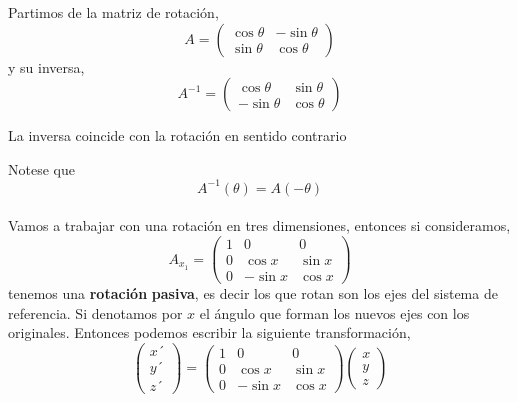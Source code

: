 \documentclass[openany]{book}
\theoremstyle{ucostyle}
\begin{document}
Partimos de la matriz de rotación, 
\begin{equation*}
    A=\begin{pmatrix}
        \cos\theta & - \sin\theta \\\sin\theta & \cos\theta
    \end{pmatrix}
\end{equation*}
y su inversa, 
\begin{equation*}
    A^{-1}=\begin{pmatrix}
        \cos\theta &  \sin\theta \\-\sin\theta & \cos\theta
    \end{pmatrix}
\end{equation*}
\begin{nota}
    La inversa coincide con la rotación en sentido contrario
\end{nota}
Notese que
\begin{equation*}
    A^{-1}(\theta)=A(-\theta)
\end{equation*}
\\
Vamos a trabajar con una rotación en tres dimensiones, entonces si consideramos, 
\begin{equation*}
    A_{x_1}=\begin{pmatrix}
        1&0&0
        \\
        0&\cos x&\sin x
        \\
        0&-\sin x & \cos x
    \end{pmatrix}
\end{equation*}
tenemos una \textbf{rotación} \textbf{pasiva}, es decir los que rotan son los ejes del sistema de referencia.  Si denotamos por $x$ el ángulo que forman los nuevos ejes con los originales. Entonces podemos escribir la siguiente transformación,
\begin{equation*}
    \begin{pmatrix}
        x´
        \\
        y´
        \\
        z´
    \end{pmatrix}=
    \begin{pmatrix}
        1&0&0
        \\
        0&\cos x&\sin x
        \\
        0&-\sin x & \cos x
    \end{pmatrix}
    \begin{pmatrix}
        x
        \\
        y
        \\
        z
    \end{pmatrix}
\end{equation*}
\end{document}
